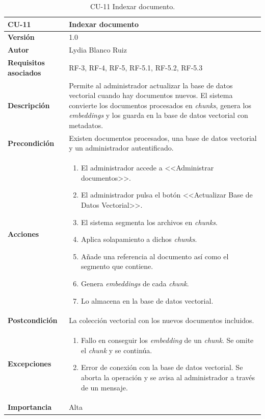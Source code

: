 \begin{table}[p]
	\centering
	\begin{tabularx}{\linewidth}{ p{} p{} }
		\toprule
		\textbf{CU-11}    & \textbf{Indexar documento}\\
		\toprule
		\textbf{Versión}              & 1.0    \\
		\textbf{Autor}                & Lydia Blanco Ruiz \\
		\textbf{Requisitos asociados} & RF-3, RF-4, RF-5, RF-5.1, RF-5.2, RF-5.3 \\
		\textbf{Descripción}          & Permite al administrador actualizar la base de datos
vectorial cuando hay documentos nuevos. El sistema convierte los documentos procesados en \textit{chunks}, genera los \textit{embeddings} y los guarda en la base de datos vectorial con metadatos. \\
		\textbf{Precondición}         & Existen documentos procesados, una base de datos vectorial y un administrador autentificado. \\
		\textbf{Acciones}             &
		\begin{enumerate}
			\def\labelenumi{\arabic{enumi}.}
			\tightlist
			\item El administrador accede a <<Administrar documentos>>.
			\item El administrador pulsa el botón <<Actualizar Base de Datos Vectorial>>.
			\item El sistema segmenta los archivos en \textit{chunks}.
			\item Aplica solapamiento a dichos \textit{chunks}.
			\item Añade una referencia al documento así como el segmento que contiene.
			\item Genera \textit{embeddings} de cada \textit{chunk}.
			\item Lo almacena en la base de datos vectorial.
		\end{enumerate}\\
		\textbf{Postcondición}        & La colección vectorial con los nuevos documentos incluidos. \\
		\textbf{Excepciones}          & 
		\begin{enumerate}
			\def\labelenumi{\arabic{enumi}.}
			\tightlist
			\item Fallo en conseguir los \textit{embedding} de un \textit{chunk}. Se omite el \textit{chunk} y se continúa.
			\item Error de conexión con la base de datos vectorial. Se aborta la operación y se avisa al administrador
a través de un mensaje.
		\end{enumerate}\\
		\textbf{Importancia}          & Alta  \\
		\bottomrule
	\end{tabularx}
	\caption{CU-11 Indexar documento.}
\end{table}

